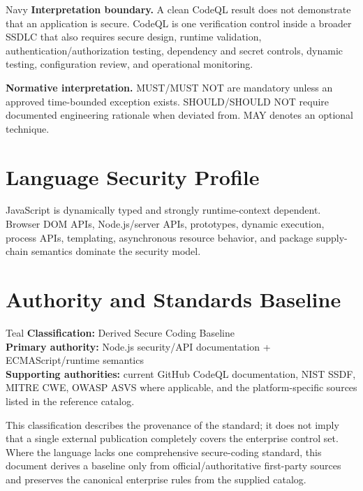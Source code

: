 \documentclass[10pt,letterpaper]{article}
\begin{document}
\begin{callout}{Navy}
\textbf{Interpretation boundary.} A clean CodeQL result does not demonstrate that an application is secure. CodeQL is one verification control inside a broader SSDLC that also requires secure design, runtime validation, authentication/authorization testing, dependency and secret controls, dynamic testing, configuration review, and operational monitoring.
\end{callout}

\textbf{Normative interpretation.} MUST/MUST NOT are mandatory unless an approved time-bounded exception exists. SHOULD/SHOULD NOT require documented engineering rationale when deviated from. MAY denotes an optional technique.

\section{Language Security Profile}
JavaScript is dynamically typed and strongly runtime-context dependent. Browser DOM APIs, Node.js/server APIs, prototypes, dynamic execution, process APIs, templating, asynchronous resource behavior, and package supply-chain semantics dominate the security model.
\section{Authority and Standards Baseline}
\begin{callout}{Teal}
\textbf{Classification:} Derived Secure Coding Baseline\\
\textbf{Primary authority:} Node.js security/API documentation + ECMAScript/runtime semantics\\
\textbf{Supporting authorities:} current GitHub CodeQL documentation, NIST SSDF, MITRE CWE, OWASP ASVS where applicable, and the platform-specific sources listed in the reference catalog.
\end{callout}
This classification describes the provenance of the standard; it does not imply that a single external publication completely covers the enterprise control set. Where the language lacks one comprehensive secure-coding standard, this document derives a baseline only from official/authoritative first-party sources and preserves the canonical enterprise rules from the supplied catalog.
\end{document}
